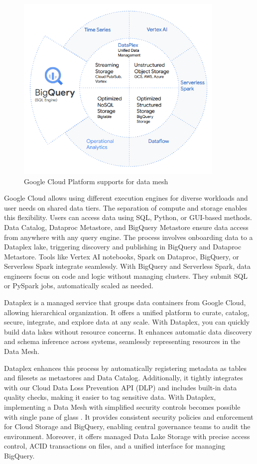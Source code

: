 \documentclass[12pt, a4paper]{book}
\begin{document}
\begin{figure}[ht]
	\begin{framed}
		\centering
		\includegraphics[width=10cm]{GCPDataMesh.png}
		\caption{Google Cloud Platform supports for data mesh}
		\label{GCPDataMesh}
	\end{framed}
\end{figure}

Google Cloud allows using different execution engines for diverse workloads and user needs on shared data tiers. The separation of compute and storage enables this flexibility. Users can access data using SQL, Python, or GUI-based methods. Data Catalog, Dataproc Metastore, and BigQuery Metastore ensure data access from anywhere with any query engine. The process involves onboarding data to a Dataplex lake, triggering discovery and publishing in BigQuery and Dataproc Metastore. Tools like Vertex AI notebooks, Spark on Dataproc, BigQuery, or Serverless Spark integrate seamlessly. With BigQuery and Serverless Spark, data engineers focus on code and logic without managing clusters. They submit SQL or PySpark jobs, automatically scaled as needed.

Dataplex is a managed service that groups data containers from Google Cloud, allowing hierarchical organization. It offers a unified platform to curate, catalog, secure, integrate, and explore data at any scale. With Dataplex, you can quickly build data lakes without resource concerns. It enhances automatic data discovery and schema inference across systems, seamlessly representing resources in the Data Mesh.

Dataplex enhances this process by automatically registering metadata as tables and filesets as metastores and Data Catalog. Additionally, it tightly integrates with our Cloud Data Loss Prevention API (DLP) and includes built-in data quality checks, making it easier to tag sensitive data. With Dataplex, implementing a Data Mesh with simplified security controls becomes possible with single pane of glass \cite{gcloud}. It provides consistent security policies and enforcement for Cloud Storage and BigQuery, enabling central governance teams to audit the environment. Moreover, it offers managed Data Lake Storage with precise access control, ACID transactions on files, and a unified interface for managing BigQuery.
\end{document}
